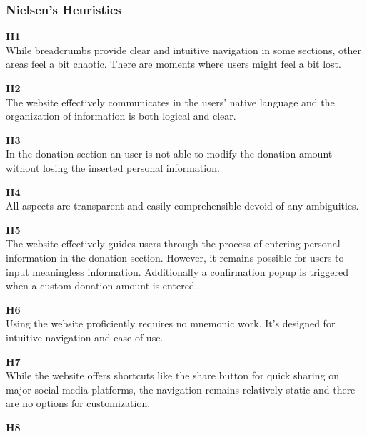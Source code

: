\subsubsection{Nielsen's Heuristics}
\begin{description}
    \item {\textbf{H1} \color{unicefGray}{Visibility of the system status}}\\
    While breadcrumbs provide clear and intuitive navigation in some sections, other areas feel a bit chaotic. 
    There are moments where users might feel a bit lost.
    \item {\textbf{H2} \color{unicefGray}{Match between system and the real world}}\\
    The website effectively communicates in the users' native language and the organization of information is both logical and clear.
    \item {\textbf{H3} \color{unicefGray}{User control and freedom}}\\
    In the donation section an user is not able to modify the donation amount without losing the inserted personal information.
    \item {\textbf{H4} \color{unicefGray}{Consistency and standards}}\\
    All aspects are transparent and easily comprehensible devoid of any ambiguities.
    \item {\textbf{H5} \color{unicefGray}{Error prevention}}\\
    The website effectively guides users through the process of entering personal information in the donation section. 
    However, it remains possible for users to input meaningless information.
    Additionally a confirmation popup is triggered when a custom donation amount is entered.
    \item {\textbf{H6} \color{unicefGray}{Recognition rather than recall}}\\
    Using the website proficiently requires no mnemonic work. It's designed for intuitive navigation and ease of use.
    \item {\textbf{H7} \color{unicefGray}{Flexibility and efficiency of use}}\\
    While the website offers shortcuts like the share button for quick sharing on major social media platforms, the navigation remains relatively static and there are no options for customization.
    \item {\textbf{H8} \color{unicefGray}{Aesthetic and minimalist design}}\\

\end{description}

